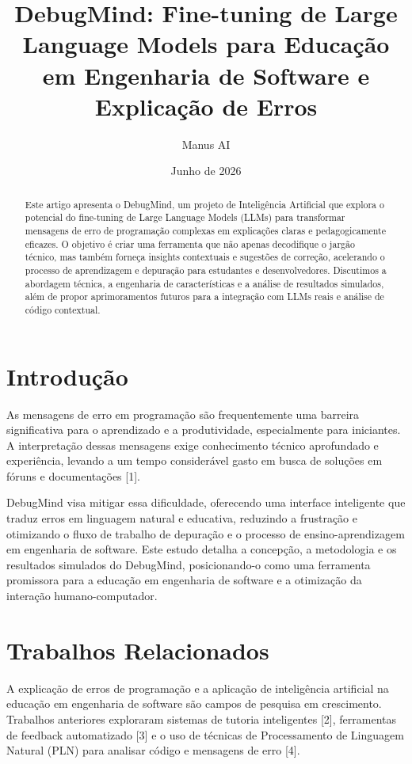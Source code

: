 \documentclass{article}
\title{DebugMind: Fine-tuning de Large Language Models para Educação em Engenharia de Software e Explicação de Erros}
\author{Manus AI}
\date{Junho de 2026}
\begin{document}
\maketitle

\begin{abstract}
Este artigo apresenta o DebugMind, um projeto de Inteligência Artificial que explora o potencial do fine-tuning de Large Language Models (LLMs) para transformar mensagens de erro de programação complexas em explicações claras e pedagogicamente eficazes. O objetivo é criar uma ferramenta que não apenas decodifique o jargão técnico, mas também forneça insights contextuais e sugestões de correção, acelerando o processo de aprendizagem e depuração para estudantes e desenvolvedores. Discutimos a abordagem técnica, a engenharia de características e a análise de resultados simulados, além de propor aprimoramentos futuros para a integração com LLMs reais e análise de código contextual.
\end{abstract}

\section{Introdução}

As mensagens de erro em programação são frequentemente uma barreira significativa para o aprendizado e a produtividade, especialmente para iniciantes. A interpretação dessas mensagens exige conhecimento técnico aprofundado e experiência, levando a um tempo considerável gasto em busca de soluções em fóruns e documentações [1].

DebugMind visa mitigar essa dificuldade, oferecendo uma interface inteligente que traduz erros em linguagem natural e educativa, reduzindo a frustração e otimizando o fluxo de trabalho de depuração e o processo de ensino-aprendizagem em engenharia de software. Este estudo detalha a concepção, a metodologia e os resultados simulados do DebugMind, posicionando-o como uma ferramenta promissora para a educação em engenharia de software e a otimização da interação humano-computador.

\section{Trabalhos Relacionados}

A explicação de erros de programação e a aplicação de inteligência artificial na educação em engenharia de software são campos de pesquisa em crescimento. Trabalhos anteriores exploraram sistemas de tutoria inteligentes [2], ferramentas de feedback automatizado [3] e o uso de técnicas de Processamento de Linguagem Natural (PLN) para analisar código e mensagens de erro [4].
\end{document}
